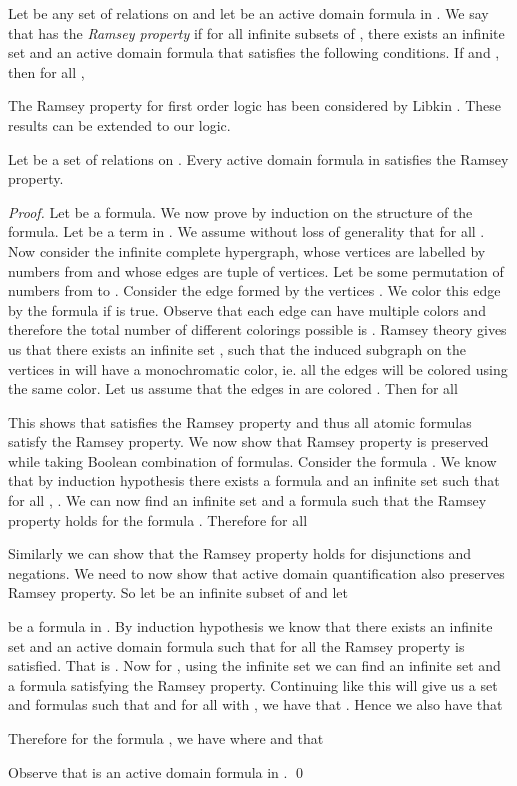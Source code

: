\documentclass[envcountsame]{llncs}
\begin{document}
Let  be any set of relations on  and let  be an active domain formula in . We say that
 has the \emph{Ramsey property} if for all infinite subsets  of , there exists an infinite set  and an active
domain formula  that satisfies the following conditions. 
If  and , then for all ,
 

The Ramsey property for first order logic has been considered by Libkin \cite{libkin_FMT}. These results can be extended
to our logic.

\begin{theorem}
\label{thm_ramsey}
Let  be a set of relations on . Every active domain formula in  satisfies 
the Ramsey property.
\end{theorem}
\begin{proof}
  Let  be a formula. We now prove by induction on the structure of the formula.
  Let  be a term in . We assume without loss of generality that for all .
  Now consider the infinite complete hypergraph, whose vertices are labelled by numbers from  and whose edges are  tuple of vertices.
 Let  be some permutation of numbers from  to . Consider the edge formed by the vertices . 
 We color this edge by the formula  if  is true. Observe that each edge can
 have multiple colors and therefore the total number of different colorings possible is . Ramsey theory gives us that there exists
 an infinite set , such that the induced subgraph on the vertices in  will have a monochromatic color, ie. all the
 edges will be colored using the same color. Let us assume that the edges in  are colored . Then for all
 
 
This shows that  satisfies the Ramsey property and thus all atomic formulas satisfy the Ramsey property.
We now show that Ramsey property is preserved while taking Boolean combination of formulas. Consider the formula . We know that by induction hypothesis there exists a formula  and an infinite set  such that
for all , . We can now find an
infinite set  and a formula  such that the Ramsey property holds for the formula . Therefore for all

 
Similarly we can show that the Ramsey property holds for disjunctions and negations.
We need to now show that active domain quantification also preserves
Ramsey property. So let  be an infinite subset of  and let

be a formula in .
By induction hypothesis we know that there exists an infinite set  and an active domain formula  such that for all  the Ramsey property is satisfied. That is 
. Now for , using the infinite set  we can find an infinite 
set  and a formula  satisfying the Ramsey property. Continuing like this will give us a set  and formulas
 such that  and for all  with , we have
that . Hence we also have 
that 

Therefore for the formula , we
have  where  and   that

Observe that  is an active domain formula in .
\qed \end{proof}
\end{document}
